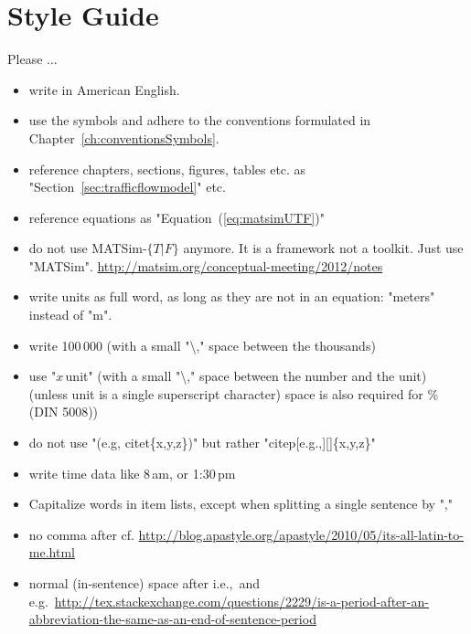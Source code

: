



\section*{Style Guide}
\label{sec:styleguide}

Please ...

\begin{itemize}

\item write in American English.

\item use the symbols and adhere to the conventions formulated in Chapter~\ref{ch:conventionsSymbols}.

\item reference chapters, sections, figures, tables etc. as "Section~\ref{sec:trafficflowmodel}" etc.

\item reference equations as "Equation~(\ref{eq:matsimUTF})"

\item do not use MATSim-$\{T\lvert F\}$ anymore. It is a framework not a toolkit. Just use "MATSim". \url{http://matsim.org/conceptual-meeting/2012/notes}

\item write units as full word, as long as they are not in an equation: "meters" instead of "m".

\item write 100\,000 (with a small "\textbackslash," space between the thousands)

\item use "$x$\,unit" (with a small "\textbackslash," space between the number and the unit) (unless unit is a single superscript character) space is also required for \% (DIN 5008))

\item do not use "(e.g, citet\{x,y,z\})" but rather "citep[e.g.,][]\{x,y,z\}"

\item write time data like 8\,am, or 1:30\,pm

\item Capitalize words in item lists, except when splitting a single sentence by ","

\item no comma after cf. \url{http://blog.apastyle.org/apastyle/2010/05/its-all-latin-to-me.html}

\item normal (in-sentence) space after i.e.,\ and e.g.\ \url{http://tex.stackexchange.com/questions/2229/is-a-period-after-an-abbreviation-the-same-as-an-end-of-sentence-period}

\end{itemize}

